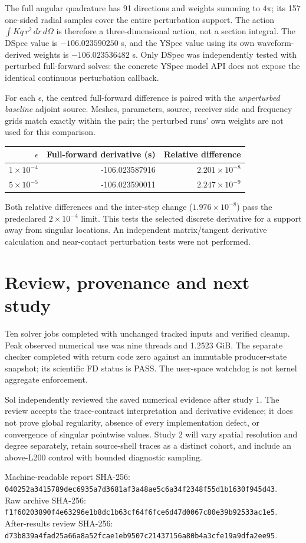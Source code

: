\documentclass[11pt,a4paper]{article}
\begin{document}
The full angular quadrature has 91 directions and weights summing to $4\pi$; its 157 one-sided radial samples cover the entire perturbation support. The action $\int Kq\,r^2\,dr\,d\Omega$ is therefore a three-dimensional action, not a section integral. The DSpec value is $-106.023590250$ s, and the YSpec value using its own waveform-derived weights is $-106.023536482$ s. Only DSpec was independently tested with perturbed full-forward solves: the concrete YSpec model API does not expose the identical continuous perturbation callback.

For each $\epsilon$, the centred full-forward difference is paired with the \emph{unperturbed baseline} adjoint source. Meshes, parameters, source, receiver side and frequency grids match exactly within the pair; the perturbed runs' own weights are not used for this comparison.
\begin{center}\begin{tabular}{rrr}\toprule
$\epsilon$ & Full-forward derivative (s) & Relative difference \\\midrule
$1\times10^{-4}$ & -106.023587916 & $2.201\times10^{-8}$ \\
$5\times10^{-5}$ & -106.023590011 & $2.247\times10^{-9}$ \\
\bottomrule\end{tabular}\end{center}
Both relative differences and the inter-step change ($1.976\times10^{-8}$) pass the predeclared $2\times10^{-4}$ limit. This tests the selected discrete derivative for a support away from singular locations. An independent matrix/tangent derivative calculation and near-contact perturbation tests were not performed.

\section{Review, provenance and next study}
Ten solver jobs completed with unchanged tracked inputs and verified cleanup. Peak observed numerical use was nine threads and 1.2523 GiB. The separate checker completed with return code zero against an immutable producer-state snapshot; its scientific FD status is PASS. The user-space watchdog is not kernel aggregate enforcement.

Sol independently reviewed the saved numerical evidence after study 1. The review accepts the trace-contract interpretation and derivative evidence; it does not prove global regularity, absence of every implementation defect, or convergence of singular pointwise values. Study 2 will vary spatial resolution and degree separately, retain source-shell traces as a distinct cohort, and include an above-L200 control with bounded diagnostic sampling.

\footnotesize
Machine-readable report SHA-256: \texttt{040252a3415789dec6935a7d3681af3a48ae5c6a34f2348f55d1b1630f945d43}.\\
Raw archive SHA-256: \texttt{f1f60203890f4e63296e1b8dc1b63cf64f6fce6d47d0067c80e39b92533ac1e5}.\\
After-results review SHA-256: \texttt{d73b839a4fad25a66a8a52fcae1eb9507c21437156a80b4a3cfe19a9dfa2ee95}.
\normalsize
\end{document}
